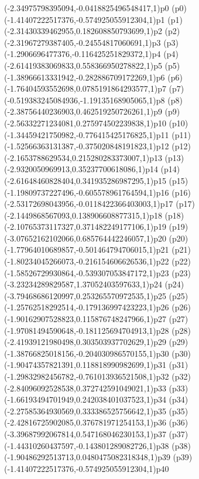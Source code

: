 \psPoint(-2.34975798395094,-0.0418825496548417,1){p0}
\psdot(p0)
\psPoint(-1.41407222517376,-0.574925055912304,1){p1}
\psdot(p1)
\psPoint(-2.31430339462955,0.182608850793699,1){p2}
\psdot(p2)
\psPoint(-2.31967279387405,-0.24554817060691,1){p3}
\psdot(p3)
\psPoint(-1.2906696477376,-0.116425251829372,1){p4}
\psdot(p4)
\psPoint(-2.61419383069833,0.558366950278822,1){p5}
\psdot(p5)
\psPoint(-1.38966613331942,-0.282886709172269,1){p6}
\psdot(p6)
\psPoint(-1.76404593552698,0.0785191864293577,1){p7}
\psdot(p7)
\psPoint(-0.519383245084936,-1.19135168905065,1){p8}
\psdot(p8)
\psPoint(-2.38756440236903,0.462519250726261,1){p9}
\psdot(p9)
\psPoint(-2.56332271234081,0.275974502239838,1){p10}
\psdot(p10)
\psPoint(-1.34459421750982,-0.776415425176825,1){p11}
\psdot(p11)
\psPoint(-1.52566363131387,-0.375020848191823,1){p12}
\psdot(p12)
\psPoint(-2.1653788629534,0.215280283373007,1){p13}
\psdot(p13)
\psPoint(-2.9320050969913,0.35237700618086,1){p14}
\psdot(p14)
\psPoint(-2.61648460828404,0.341935286987295,1){p15}
\psdot(p15)
\psPoint(-1.19809737227496,-0.605578961764594,1){p16}
\psdot(p16)
\psPoint(-2.53172698043956,-0.0118422366403003,1){p17}
\psdot(p17)
\psPoint(-2.1449868567093,0.138906608877315,1){p18}
\psdot(p18)
\psPoint(-2.10765373117327,0.371482249177106,1){p19}
\psdot(p19)
\psPoint(-3.07652162102066,0.685764442246057,1){p20}
\psdot(p20)
\psPoint(-1.77964010689857,-0.501464794706015,1){p21}
\psdot(p21)
\psPoint(-1.80234045266073,-0.216154606626536,1){p22}
\psdot(p22)
\psPoint(-1.58526729930864,-0.539307053847172,1){p23}
\psdot(p23)
\psPoint(-3.23234289829587,1.37052403597633,1){p24}
\psdot(p24)
\psPoint(-3.79468686120997,0.253265570972535,1){p25}
\psdot(p25)
\psPoint(-1.25762518292514,-0.179136997423223,1){p26}
\psdot(p26)
\psPoint(-1.90162907528823,0.115876748247966,1){p27}
\psdot(p27)
\psPoint(-1.97081494590648,-0.181125694704913,1){p28}
\psdot(p28)
\psPoint(-2.41939121980498,0.303503937702629,1){p29}
\psdot(p29)
\psPoint(-1.38766825018156,-0.204030986570155,1){p30}
\psdot(p30)
\psPoint(-1.90474357821391,0.118818990982699,1){p31}
\psdot(p31)
\psPoint(-1.29832982456782,-0.761013936521508,1){p32}
\psdot(p32)
\psPoint(-2.84096092528538,0.372742591049021,1){p33}
\psdot(p33)
\psPoint(-1.66193494701949,0.242038401037523,1){p34}
\psdot(p34)
\psPoint(-2.27585364930569,0.333386525756642,1){p35}
\psdot(p35)
\psPoint(-2.42816725902085,0.376781971254153,1){p36}
\psdot(p36)
\psPoint(-3.39687992067814,0.547168046230153,1){p37}
\psdot(p37)
\psPoint(-1.44310260437597,-0.143801289082726,1){p38}
\psdot(p38)
\psPoint(-1.90486292513713,0.0480475082318348,1){p39}
\psdot(p39)
\psPoint(-1.41407222517376,-0.574925055912304,1){p40}

